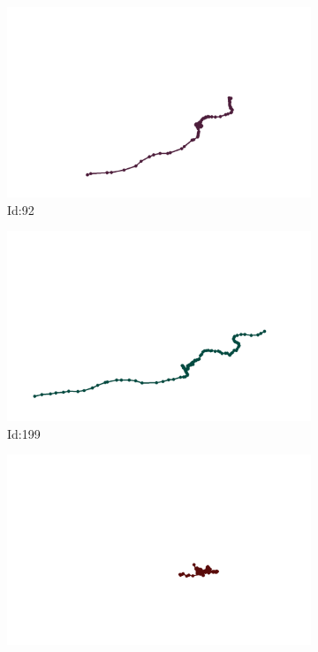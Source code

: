 \documentclass[12pt,twoside]{report}
\begin{document}
\begin{figure}
\centering
\begin{subfigure}[b]{0.20\textwidth}
\centering
\includegraphics[width=\textwidth]{../../trajectories/92.png}
\caption{Id:92}
\end{subfigure}
\begin{subfigure}[b]{0.20\textwidth}
\centering
\includegraphics[width=\textwidth]{../../trajectories/199.png}
\caption{Id:199}
\end{subfigure}
\begin{subfigure}[b]{0.20\textwidth}
\centering
\includegraphics[width=\textwidth]{../../trajectories/369.png}

\end{subfigure}
\end{figure}
\end{document}
